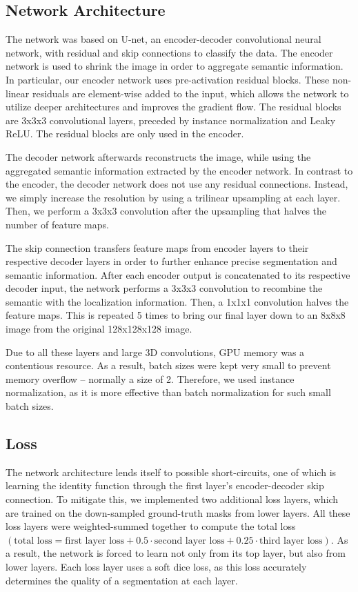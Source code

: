 \documentclass[12pt, letterpaper]{article}
\begin{document}
	\subsection{Network Architecture}
	The network was based on U-net, an encoder-decoder convolutional neural network, with residual and skip connections to classify the data. The encoder network is used to shrink the image in order to aggregate semantic information. In particular, our encoder network uses pre-activation residual blocks. These non-linear residuals are element-wise added to the input, which allows the network to utilize deeper architectures and improves the gradient flow. The residual blocks are 3x3x3 convolutional layers, preceded by instance normalization and Leaky ReLU. The residual blocks are only used in the encoder.\par
	The decoder network afterwards reconstructs the image, while using the aggregated semantic information extracted by the encoder network. In contrast to the encoder, the decoder network does not use any residual connections. Instead, we simply increase the resolution by using a trilinear upsampling at each layer. Then, we perform a 3x3x3 convolution after the upsampling that halves the number of feature maps.\par
	The skip connection transfers feature maps from encoder layers to their respective decoder layers in order to further enhance precise segmentation and semantic information. After each encoder output is concatenated to its respective decoder input, the network performs a 3x3x3 convolution to recombine the semantic with the localization information. Then, a 1x1x1 convolution halves the feature maps. This is repeated 5 times to bring our final layer down to an 8x8x8 image from the original 128x128x128 image.\par
	Due to all these layers and large 3D convolutions, GPU memory was a contentious resource. As a result, batch sizes were kept very small to prevent memory overflow -- normally a size of 2. Therefore, we used instance normalization, as it is more effective than batch normalization for such small batch sizes.\par
	\subsection{Loss}
	The network architecture lends itself to possible short-circuits, one of which is learning the identity function through the first layer’s encoder-decoder skip connection. To mitigate this, we implemented two additional loss layers, which are trained on the down-sampled ground-truth masks from lower layers. All these loss layers were weighted-summed together to compute the total loss $(\text{total loss} = \text{first layer loss} + 0.5 \cdot \text{second layer loss} + 0.25 \cdot \text{third layer loss})$. As a result, the network is forced to learn not only from its top layer, but also from lower layers. Each loss layer uses a soft dice loss, as this loss accurately determines the quality of a segmentation at each layer.\par
\end{document}
